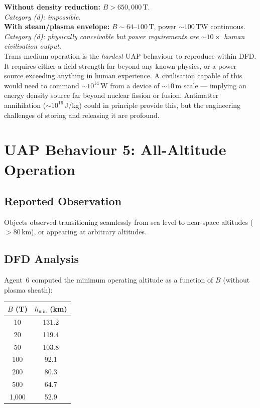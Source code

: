 \documentclass[12pt,a4paper]{article}
\begin{document}
\begin{tcolorbox}[colback=red!5!white, colframe=red!60!black,
  title=Trans-Medium Assessment]
\textbf{Without density reduction:} $B > 650{,}000$\,T.\\
\emph{Category (d): impossible.}\\[4pt]
\textbf{With steam/plasma envelope:} $B \sim 64$--$100$\,T,
power $\sim 100$\,TW continuous.\\
\emph{Category (d): physically conceivable but power requirements are
$\sim 10\times$ human civilisation output.}\\[4pt]
Trans-medium operation is the \emph{hardest} UAP behaviour to reproduce
within DFD.  It requires either a field strength far beyond any known
physics, or a power source exceeding anything in human experience.
A civilisation capable of this would need to command $\sim 10^{14}$\,W
from a device of $\sim 10$\,m scale --- implying an energy density
source far beyond nuclear fission or fusion.  Antimatter annihilation
($\sim 10^{16}$\,J/kg) could in principle provide this, but the
engineering challenges of storing and releasing it are profound.
\end{tcolorbox}


\section{UAP Behaviour 5: All-Altitude Operation}\label{sec:altitude}

\subsection{Reported Observation}

Objects observed transitioning seamlessly from sea level to near-space
altitudes ($> 80$\,km), or appearing at arbitrary altitudes.

\subsection{DFD Analysis}

Agent~6 computed the minimum operating altitude as a function of $B$
(without plasma sheath):

\begin{center}
\begin{tabular}{cc}
\toprule
$B$ (T) & $h_{\min}$ (km) \\
\midrule
10  & 131.2 \\
20  & 119.4 \\
50  & 103.8 \\
100 & 92.1  \\
200 & 80.3  \\
500 & 64.7  \\
1{,}000 & 52.9 \\
\bottomrule
\end{tabular}
\end{center}
\end{document}
